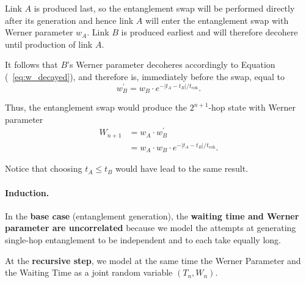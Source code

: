 \documentclass{masterthesis}
\begin{document}
Link $A$ is produced last, so the entanglement swap will be performed directly after its generation and hence link $A$ will enter the entanglement swap with Werner parameter $w_{A}$. Link $B$ is produced earliest and will therefore decohere until production of link $A$.

It follows that $B$'s Werner parameter decoheres accordingly to Equation (~\ref{eq:w_decayed}), and therefore is, immediately before the swap, equal to
\begin{equation*}
    w_{B}^{\prime} = w_{B} \cdot e^{-\left|t_{A}-t_{B}\right| / t_\text{coh}} .
\end{equation*}

Thus, the entanglement swap would produce the $2^{n+1}$-hop state with Werner parameter
\begin{align}
W_{n+1} &= w_{A} \cdot w_{B}^{\prime} \nonumber \\
        &= w_{A} \cdot w_{B} \cdot e^{-\left|t_{A}-t_{B}\right| / t_\text{coh}} .
\end{align}

Notice that choosing $t_{A} \leq t_{B}$ would have lead to the same result.

\paragraph*{Induction.}

In the \textbf{base case} (entanglement generation), the \textbf{waiting time and Werner parameter are uncorrelated} because we model the attempts at generating single-hop entanglement to be independent and to each take equally long.

At the \textbf{recursive step}, we model at the same time the Werner Parameter and the Waiting Time as a joint random variable $(T_n, W_n)$.

\end{document}
